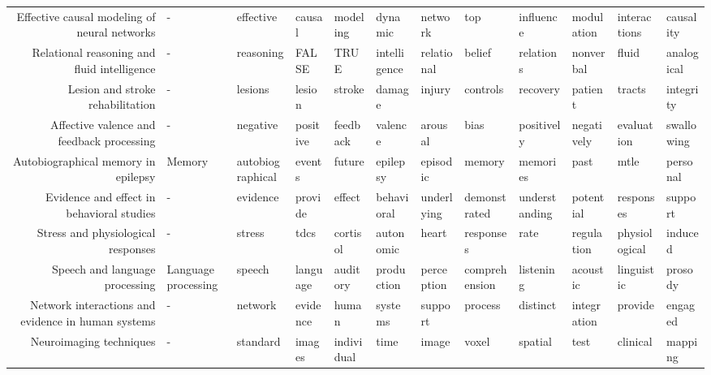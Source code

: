 \begin{tabular}{rlllllllllll}
      Effective causal modeling of neural networks &                   - &        effective &        causal &        modeling &        dynamic &     network &            top &     influence &     modulation &  interactions &      causality \\
       Relational reasoning and fluid intelligence &                   - &        reasoning &         FALSE &            TRUE &   intelligence &  relational &         belief &     relations &      nonverbal &         fluid &     analogical \\
                  Lesion and stroke rehabilitation &                   - &          lesions &        lesion &          stroke &         damage &      injury &       controls &      recovery &        patient &        tracts &      integrity \\
         Affective valence and feedback processing &                   - &         negative &      positive &        feedback &        valence &     arousal &           bias &    positively &     negatively &    evaluation &     swallowing \\
               Autobiographical memory in epilepsy &              Memory & autobiographical &        events &          future &       epilepsy &    episodic &         memory &      memories &           past &          mtle &       personal \\
         Evidence and effect in behavioral studies &                   - &         evidence &       provide &          effect &     behavioral &  underlying &   demonstrated & understanding &      potential &     responses &        support \\
                Stress and physiological responses &                   - &           stress &          tdcs &        cortisol &      autonomic &       heart &      responses &          rate &     regulation & physiological &        induced \\
                    Speech and language processing & Language processing &           speech &      language &        auditory &     production &  perception &  comprehension &     listening &       acoustic &    linguistic &        prosody \\
Network interactions and evidence in human systems &                   - &          network &      evidence &           human &        systems &     support &        process &      distinct &    integration &       provide &        engaged \\
                           Neuroimaging techniques &                   - &         standard &        images &      individual &           time &       image &          voxel &       spatial &           test &      clinical &        mapping \\

\end{tabular}
